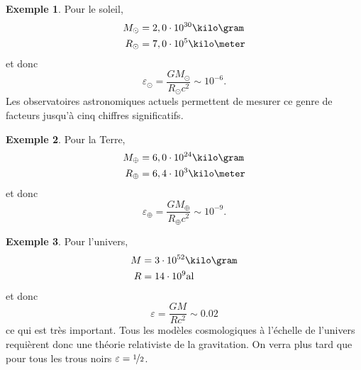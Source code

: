 \documentclass[a4paper,11pt]{report}
\theoremstyle{definition}
\theoremstyle{plain}
\theoremstyle{definition}
\newtheorem{exmp}{Exemple}[chapter]
\theoremstyle{remark}
\begin{document}
        \begin{exmp}
            Pour le soleil,
            \begin{align*}
                M_\odot &= 2,0\cdot10^{30}\kilo\gram \\
                R_\odot &= 7,0\cdot10^{5}\kilo\meter
            \end{align*}
            et donc
            \begin{equation}
                \varepsilon_\odot  = \frac{GM_\odot}{R_\odot c^2}\sim 10^{-6}.
            \end{equation}
            Les observatoires astronomiques actuels permettent de mesurer ce genre de facteurs jusqu'à cinq chiffres significatifs. 
        \end{exmp}
        \begin{exmp}
            Pour la Terre,
            \begin{align*}
                M_\oplus &= 6,0\cdot10^{24}\kilo\gram \\
                R_\oplus &= 6,4\cdot10^{3}\kilo\meter
            \end{align*}
            et donc
            \begin{equation}
                \varepsilon_\oplus = \frac{GM_\oplus}{R_\oplus c^2}\sim 10^{-9}.
            \end{equation}
        \end{exmp}
        \begin{exmp}
            Pour l'univers,
            \begin{align*}
                M &= 3\cdot10^{52}\kilo\gram \\
                R &= 14\cdot10^{9}\text{al}
            \end{align*}
            et donc
            \begin{equation}
                \varepsilon = \frac{GM}{Rc^2}\sim 0.02
            \end{equation}
            ce qui est très important. Tous les modèles cosmologiques à l'échelle de l'univers requièrent donc une théorie relativiste de la gravitation. On verra plus tard que pour tous les trous noirs $\varepsilon = \nicefrac{1}{2}$.
        \end{exmp}
        
\end{document}
